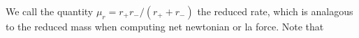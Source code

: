 We call the quantity \(\mu_r = r_+r_-/(r_+ + r_-)\) the reduced rate, which is analagous to the reduced mass when computing net newtonian or la force.  Note that